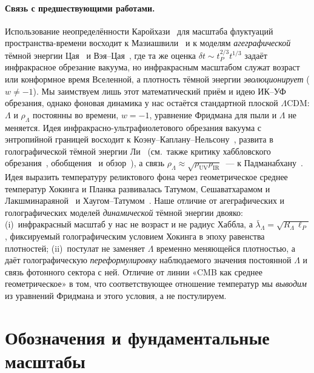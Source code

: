 \documentclass[12pt,a4paper]{article}
\begin{document}
\paragraph{Связь с предшествующими работами.} Использование неопределённости Каройхази~\cite{Karolyhazy1966} для масштаба флуктуаций пространства-времени восходит к Мазиашвили~\cite{Maziashvili2007} и к моделям \emph{агеграфической} тёмной энергии Цая~\cite{Cai2007} и Вэя--Цая~\cite{WeiCai2008}, где та же оценка $\delta t\sim t_P^{2/3}t^{1/3}$ задаёт инфракрасное обрезание вакуума, но инфракрасным масштабом служат возраст или конформное время Вселенной, а плотность тёмной энергии \emph{эволюционирует} ($w\neq-1$). Мы заимствуем лишь этот математический приём и идею ИК--УФ обрезания, однако фоновая динамика у нас остаётся стандартной плоской $\Lambda$CDM: $\Lambda$ и $\rho_\Lambda$ постоянны во времени, $w=-1$, уравнение Фридмана для пыли и $\Lambda$ не меняется. Идея инфракрасно-ультрафиолетового обрезания вакуума с энтропийной границей восходит к Коэну--Каплану--Нельсону~\cite{Cohen1999}, развита в голографической тёмной энергии Ли~\cite{Li2004} (см.\ также критику хаббловского обрезания~\cite{Hsu2004}, обобщения~\cite{NojiriOdintsov2006} и обзор~\cite{WangWangLi2017}), а связь $\rho_\Lambda\approx\sqrt{\rho_{\mathrm{UV}}\rho_{\mathrm{IR}}}$~--- к Падманабхану~\cite{Padmanabhan2005}. Идея выразить температуру реликтового фона через геометрическое среднее температур Хокинга и Планка развивалась Татумом, Сешаватхарамом и Лакшминараяной~\cite{Tatum2015} и Хаугом--Татумом~\cite{Haug2024}. Наше отличие от агеграфических и голографических моделей \emph{динамической} тёмной энергии двояко: (i)~инфракрасный масштаб у нас не возраст и не радиус Хаббла, а $\bar\lambda_\Lambda=\sqrt{R_\Lambda\,\ell_P}$, фиксируемый голографическим условием Хокинга в эпоху равенства плотностей; (ii)~постулат не заменяет $\Lambda$ временно меняющейся плотностью, а даёт голографическую \emph{переформулировку} наблюдаемого значения постоянной $\Lambda$ и связь фотонного сектора с ней. Отличие от линии «CMB как среднее геометрическое» в том, что соответствующее отношение температур мы \emph{выводим} из уравнений Фридмана и этого условия, а не постулируем.

\section{Обозначения и фундаментальные масштабы}
\end{document}
